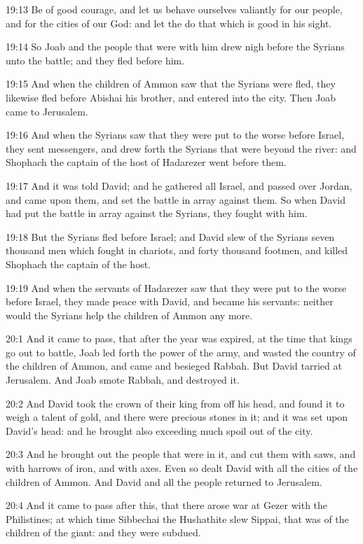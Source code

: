 19:13 Be of good courage, and let us behave ourselves valiantly for our people, and for the cities of our God: and let the \LORD do that which is good in his sight.

19:14 So Joab and the people that were with him drew nigh before the Syrians unto the battle; and they fled before him.

19:15 And when the children of Ammon saw that the Syrians were fled, they likewise fled before Abishai his brother, and entered into the city. Then Joab came to Jerusalem.

19:16 And when the Syrians saw that they were put to the worse before Israel, they sent messengers, and drew forth the Syrians that were beyond the river: and Shophach the captain of the host of Hadarezer went before them.

19:17 And it was told David; and he gathered all Israel, and passed over Jordan, and came upon them, and set the battle in array against them. So when David had put the battle in array against the Syrians, they fought with him.

19:18 But the Syrians fled before Israel; and David slew of the Syrians seven thousand men which fought in chariots, and forty thousand footmen, and killed Shophach the captain of the host.

19:19 And when the servants of Hadarezer saw that they were put to the worse before Israel, they made peace with David, and became his servants: neither would the Syrians help the children of Ammon any more.

20:1 And it came to pass, that after the year was expired, at the time that kings go out to battle, Joab led forth the power of the army, and wasted the country of the children of Ammon, and came and besieged Rabbah. But David tarried at Jerusalem. And Joab smote Rabbah, and destroyed it.

20:2 And David took the crown of their king from off his head, and found it to weigh a talent of gold, and there were precious stones in it; and it was set upon David's head: and he brought also exceeding much spoil out of the city.

20:3 And he brought out the people that were in it, and cut them with saws, and with harrows of iron, and with axes. Even so dealt David with all the cities of the children of Ammon. And David and all the people returned to Jerusalem.

20:4 And it came to pass after this, that there arose war at Gezer with the Philistines; at which time Sibbechai the Hushathite slew Sippai, that was of the children of the giant: and they were subdued.

